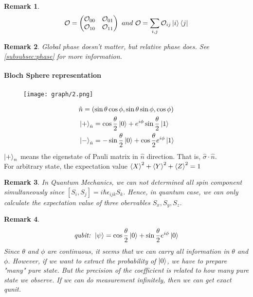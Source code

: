 \documentclass[]{book}
\newtheorem*{remark}{Remark}
\theoremstyle{nonumberplain}
\begin{document}
\begin{remark}
\[
\mathcal{O}=
\begin{pmatrix}
	\mathcal{O}_{00} & \mathcal{O}_{01} \\
	\mathcal{O}_{10} & \mathcal{O}_{11} \\
\end{pmatrix}
\ and \ 
\mathcal{O} = \sum^{}_{i,j} \mathcal{O}_{ij}\ket{i}\bra{j}
\] 
\end{remark}
\begin{remark}
Global phase doesn't matter, but relative phase does. See \ref{subsubsec:phase} for more information.
\end{remark}
\paragraph{Bloch Sphere representation}%
\begin{figure}[!hbt]
\centering
\texttt{[image: graph/2.png]}
\end{figure}
\begin{equation*}
\begin{aligned}
	& \hat{n}=(\sin{\theta}\cos{\phi},\sin{\theta}\sin{\phi},\cos{\phi})\\
	& \ket{+}_{\hat{n}}=\cos{\frac{\theta}{2}}\ket{0}+e^{i\phi}\sin{\frac{\theta}{2}} \ket{1} \\
	& \ket{-}_{\hat{n}}=-\sin{\frac{\theta}{2}}\ket{0}+\cos{\frac{\theta}{2}} e^{i\phi}\ket{1}
\end{aligned}
\end{equation*}
$\ket{+}_{n}$ means the eigenstate of Pauli matrix in $\hat{n}$ direction. That is, $\hat{\sigma} \cdot \hat{n}$. \\
For arbitrary state, the expectation value $\braket{X}^{2}+\braket{Y}^{2}+\braket{Z}^{2}=1$
\begin{remark}
	In Quantum Mechanics, we can not determined all spin component simultaneously since $[S_{i},S_{j}]=i\hbar\epsilon_{ijk}S_{k}$. Hence, in quantum case, we can only calculate the expectation value of three obervables $S_{x},S_{y},S_{z}$.
\end{remark}
\begin{remark}
\[
	\textit{qubit: } \ket{\psi} = \cos{\frac{\theta}{2}}\ket{0}+\sin{\frac{\theta}{2}}e^{i\phi}\ket{0}
\] 
Since $\theta$ and $\phi$ are continuous, it seems that we can carry all information in $\theta$ and $\phi$. However, if we want to extract the probability of $\ket{0}$, we have to prepare "many" pure state. But the precision of the coefficient is related to how many pure state we observe. If we can do measurement infinitely, then we can get exact qunit.  
\end{remark}
\end{document}
